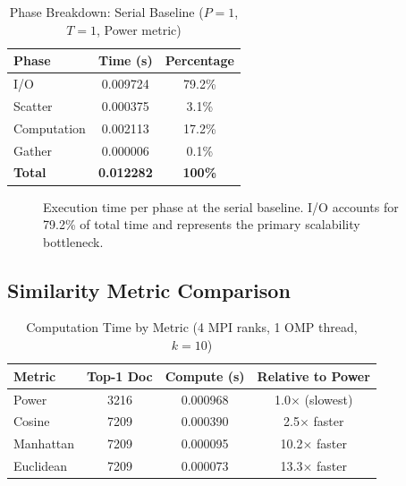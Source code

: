 \documentclass[12pt,a4paper]{article}
\begin{document}
\begin{table}[!htbp]
\centering
\small

\caption{Phase Breakdown: Serial Baseline ($P=1$, $T=1$, Power metric)}
\label{tab:phases}
\renewcommand{\arraystretch}{1.3}
\begin{tabular}{|l|c|c|}
\hline
\textbf{Phase} & \textbf{Time (s)} & \textbf{Percentage} \\
\hline
I/O           & 0.009724 & 79.2\% \\
Scatter       & 0.000375 &  3.1\% \\
Computation   & 0.002113 & 17.2\% \\
Gather        & 0.000006 &  0.1\% \\
\hline
\textbf{Total} & \textbf{0.012282} & \textbf{100\%} \\
\hline
\end{tabular}
\end{table}

\begin{figure}[!htbp]
\centering
{}
\caption{Execution time per phase at the serial baseline. I/O accounts
         for 79.2\% of total time and represents the primary scalability
         bottleneck.}
\label{fig:breakdown}
\end{figure}

\subsection{Similarity Metric Comparison}

\begin{table}[!htbp]
\centering
\small
\caption{Computation Time by Metric (4 MPI ranks, 1 OMP thread, $k=10$)}
\label{tab:metrics}
\renewcommand{\arraystretch}{1.3}
\begin{tabular}{|l|c|c|c|}
\hline
\textbf{Metric} & \textbf{Top-1 Doc} &
\textbf{Compute (s)} & \textbf{Relative to Power} \\
\hline
Power      & 3216 & 0.000968 &  1.0$\times$ (slowest) \\
Cosine     & 7209 & 0.000390 &  2.5$\times$ faster \\
Manhattan  & 7209 & 0.000095 & 10.2$\times$ faster \\
Euclidean  & 7209 & 0.000073 & 13.3$\times$ faster \\
\hline
\end{tabular}
\end{table}
\end{document}
